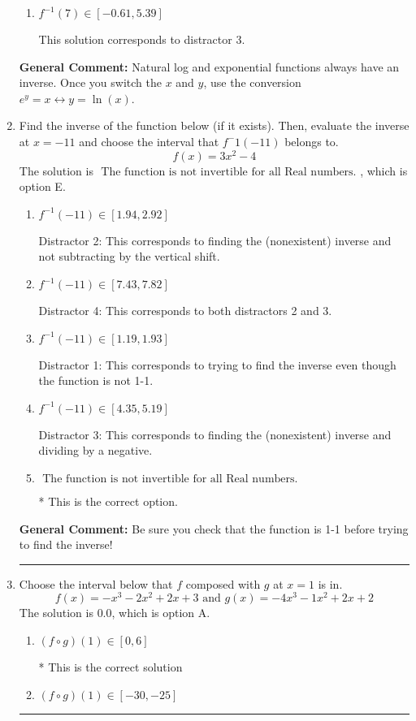 \documentclass{extbook}[14pt]
\newcommand{\litem}[1]{\item #1

\rule{\textwidth}{0.4pt}}
\begin{document}
\begin{enumerate}
{\begin{enumerate}[label=\Alph*.]
 This solution corresponds to distractor 4.
\item \( f^{-1}(7) \in [-0.61, 5.39] \)

 This solution corresponds to distractor 3.
\end{enumerate}

\textbf{General Comment:} Natural log and exponential functions always have an inverse. Once you switch the $x$ and $y$, use the conversion $ e^y = x \leftrightarrow y=\ln(x)$.
}
\litem{
Find the inverse of the function below (if it exists). Then, evaluate the inverse at $x = -11$ and choose the interval that $f^-1(-11)$ belongs to.
\[ f(x) = 3 x^2 - 4 \]The solution is \( \text{ The function is not invertible for all Real numbers. } \), which is option E.\begin{enumerate}[label=\Alph*.]
\item \( f^{-1}(-11) \in [1.94, 2.92] \)

 Distractor 2: This corresponds to finding the (nonexistent) inverse and not subtracting by the vertical shift.
\item \( f^{-1}(-11) \in [7.43, 7.82] \)

 Distractor 4: This corresponds to both distractors 2 and 3.
\item \( f^{-1}(-11) \in [1.19, 1.93] \)

 Distractor 1: This corresponds to trying to find the inverse even though the function is not 1-1. 
\item \( f^{-1}(-11) \in [4.35, 5.19] \)

 Distractor 3: This corresponds to finding the (nonexistent) inverse and dividing by a negative.
\item \( \text{ The function is not invertible for all Real numbers. } \)

* This is the correct option.
\end{enumerate}

\textbf{General Comment:} Be sure you check that the function is 1-1 before trying to find the inverse!
}
\litem{
Choose the interval below that $f$ composed with $g$ at $x=1$ is in.
\[ f(x) = -x^{3} -2 x^{2} +2 x + 3 \text{ and } g(x) = -4x^{3} -1 x^{2} +2 x + 2 \]The solution is \( 0.0 \), which is option A.\begin{enumerate}[label=\Alph*.]
\item \( (f \circ g)(1) \in [0, 6] \)

* This is the correct solution
\item \( (f \circ g)(1) \in [-30, -25] \)


\end{enumerate}}
\end{enumerate}
\end{document}
